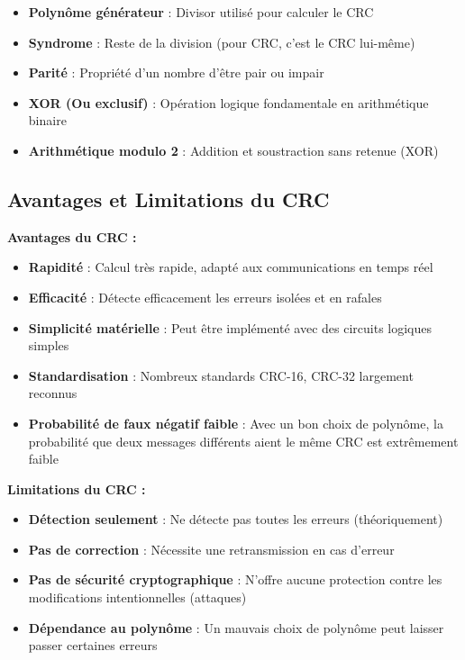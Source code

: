 \documentclass[12pt, a4paper]{article}
\begin{document}
\begin{itemize}
    \item \textbf{Polynôme générateur} : Divisor utilisé pour calculer le CRC
    \item \textbf{Syndrome} : Reste de la division (pour CRC, c'est le CRC lui-même)
    \item \textbf{Parité} : Propriété d'un nombre d'être pair ou impair
    \item \textbf{XOR (Ou exclusif)} : Opération logique fondamentale en arithmétique binaire
    \item \textbf{Arithmétique modulo 2} : Addition et soustraction sans retenue (XOR)
\end{itemize}

\subsection{Avantages et Limitations du CRC}

\textbf{Avantages du CRC :}
\begin{itemize}
    \item \textbf{Rapidité} : Calcul très rapide, adapté aux communications en temps réel
    \item \textbf{Efficacité} : Détecte efficacement les erreurs isolées et en rafales
    \item \textbf{Simplicité matérielle} : Peut être implémenté avec des circuits logiques simples
    \item \textbf{Standardisation} : Nombreux standards CRC-16, CRC-32 largement reconnus
    \item \textbf{Probabilité de faux négatif faible} : Avec un bon choix de polynôme, la probabilité que deux messages différents aient le même CRC est extrêmement faible
\end{itemize}

\textbf{Limitations du CRC :}
\begin{itemize}
    \item \textbf{Détection seulement} : Ne détecte pas toutes les erreurs (théoriquement)
    \item \textbf{Pas de correction} : Nécessite une retransmission en cas d'erreur
    \item \textbf{Pas de sécurité cryptographique} : N'offre aucune protection contre les modifications intentionnelles (attaques)
    \item \textbf{Dépendance au polynôme} : Un mauvais choix de polynôme peut laisser passer certaines erreurs
\end{itemize}
\end{document}
